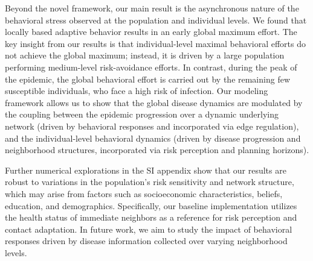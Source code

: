 \documentclass[9pt,twocolumn,twoside]{pnas-new}
\begin{document}
Beyond the novel framework, our main result is the asynchronous nature of the behavioral stress observed at the population and individual levels. We found that locally based adaptive behavior results in an early global maximum effort.
The key insight from our results is that individual-level maximal behavioral efforts do not achieve the global maximum; instead, it is driven by a large population performing medium-level risk-avoidance efforts.
In contrast, during the peak of the epidemic, the global behavioral effort is carried out by the remaining few susceptible individuals, who face a high risk of infection.
Our modeling framework allows us to show that the global disease dynamics are modulated by the coupling between the epidemic progression over a dynamic underlying network (driven by behavioral responses and incorporated via edge regulation), and the individual-level behavioral dynamics (driven by disease progression and neighborhood structures, incorporated via risk perception and planning horizons).
%

Further numerical explorations in the SI appendix 
%
show that our results are robust to variations in the population's risk sensitivity and network structure, which may arise from factors such as socioeconomic characteristics, beliefs, education, and demographics.
Specifically, our baseline implementation utilizes the health status of immediate neighbors as a reference for risk perception and contact adaptation. In future work, we aim to study the impact of behavioral responses driven by disease information collected over varying neighborhood levels.


\end{document}

